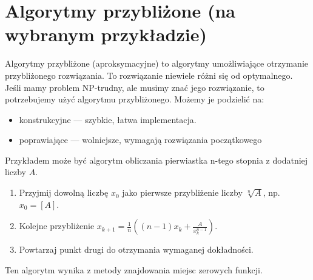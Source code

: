\documentclass[10pt, a
4paper]{article}
\begin{document}
\section{Algorytmy przybliżone (na wybranym przykładzie)}
	Algorytmy przybliżone (aproksymacyjne) to algorytmy umożliwiające otrzymanie przybliżonego rozwiązania.
    To rozwiązanie niewiele różni się od optymalnego. Jeśli mamy problem NP-trudny, ale musimy znać jego rozwiązanie,
    to potrzebujemy użyć algorytmu przybliżonego. Możemy je podzielić na:
    \begin{itemize}
    	\item konstrukcyjne --- szybkie, łatwa implementacja.
    	\item poprawiające --- wolniejsze, wymagają rozwiązania początkowego
    \end{itemize}
    Przykładem może być algorytm obliczania pierwiastka n-tego stopnia z dodatniej liczby $A$.
    \begin{enumerate}
    	\item Przyjmij dowolną liczbę $x_0$ jako pierwsze przybliżenie liczby $\sqrt[n]{A}$, np. $x_0 = [A]$.
    	\item Kolejne przybliżenie $x_{k+1} = \frac{1}{n}((n-1)x_k + {\frac{A}{x_k^{n-1}}})$.
    	\item Powtarzaj punkt drugi do otrzymania wymaganej dokładności.
    \end{enumerate}
    Ten algorytm wynika z metody znajdowania miejsc zerowych funkcji.
\end{document}
